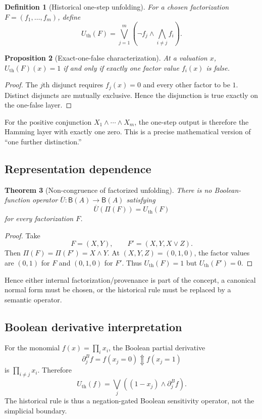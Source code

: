 \documentclass[11pt]{article}
\newtheorem{theorem}{Theorem}[section]
\newtheorem{proposition}[theorem]{Proposition}
\newtheorem{definition}[theorem]{Definition}
\newcommand{\Updown}{\mathbin{\Updownarrow}}
\begin{document}
\begin{definition}[Historical one-step unfolding]
For a chosen factorization $F=(f_1,\dots,f_m)$, define
\[
U_{\mathrm{th}}(F)
=\bigvee_{j=1}^m\left(\neg f_j\wedge\bigwedge_{i\neq j}f_i\right).
\]
\end{definition}

\begin{proposition}[Exact-one-false characterization]
At a valuation $x$, $U_{\mathrm{th}}(F)(x)=1$ if and only if exactly one factor value $f_i(x)$ is false.
\end{proposition}
\begin{proof}
The $j$th disjunct requires $f_j(x)=0$ and every other factor to be $1$.  Distinct disjuncts are mutually exclusive.  Hence the disjunction is true exactly on the one-false layer.
\end{proof}

For the positive conjunction $X_1\wedge\cdots\wedge X_m$, the one-step output is therefore the Hamming layer with exactly one zero.  This is a precise mathematical version of ``one further distinction.''

\subsection{Representation dependence}

\begin{theorem}[Non-congruence of factorized unfolding]\label{thm:noncongruence}
There is no Boolean-function operator $\overline U:\mathsf B(A)\to\mathsf B(A)$ satisfying
\[
\overline U(\Pi(F))=U_{\mathrm{th}}(F)
\]
for every factorization $F$.
\end{theorem}
\begin{proof}
Take
\[
F=(X,Y),\qquad F'=(X,Y,X\vee Z).
\]
Then $\Pi(F)=\Pi(F')=X\wedge Y$.  At $(X,Y,Z)=(0,1,0)$, the factor values are $(0,1)$ for $F$ and $(0,1,0)$ for $F'$.  Thus $U_{\mathrm{th}}(F)=1$ but $U_{\mathrm{th}}(F')=0$.
\end{proof}

Hence either internal factorization/provenance is part of the concept, a canonical normal form must be chosen, or the historical rule must be replaced by a semantic operator.

\subsection{Boolean derivative interpretation}
For the monomial $f(x)=\prod_i x_i$, the Boolean partial derivative
\[
\partial_j^Bf=f(x_j=0)\Updown f(x_j=1)
\]
is $\prod_{i\neq j}x_i$.  Therefore
\[
U_{\mathrm{th}}(f)
=\bigvee_j\left((1-x_j)\wedge\partial_j^Bf\right).
\]
The historical rule is thus a negation-gated Boolean sensitivity operator, not the simplicial boundary.
\end{document}

